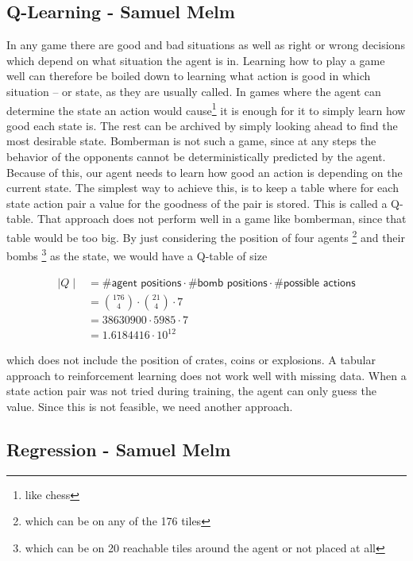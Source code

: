 \documentclass{article}
\begin{document}

\subsection[Q-Learning]{Q-Learning {\small - Samuel Melm}}

In any game there are good and bad situations as well as right or wrong decisions which depend on what situation the agent is in. Learning how to play a game well can therefore be boiled down to learning what action is good in which situation -- or state, as they are usually called. In games where the agent can determine the state an action would cause\footnote{like chess} it is enough for it to simply learn how good each state is. The rest can be archived by simply looking ahead to find the most desirable state. Bomberman is not such a game, since at any steps the behavior of the opponents cannot be deterministically predicted by the agent. Because of this, our agent needs to learn how good an action is depending on the current state. The simplest way to achieve this, is to keep a table where for each state action pair a value for the goodness of the pair is stored. This is called a Q-table. That approach does not perform well in a game like bomberman, since that table would be too big. By just considering the position of four agents \footnote{which can be on any of the 176 tiles} and their bombs \footnote{which can be on 20 reachable tiles around the agent or not placed at all} as the state, we would have a Q-table of size

\begin{align*}
    \mid Q \mid &= \# \textsf{agent positions} \cdot \# \textsf{bomb positions} \cdot \# \textsf{possible actions} \\
    &= {176 \choose 4} \cdot {21 \choose 4 } \cdot 7 \\
    &= 38630900 \cdot 5985 \cdot 7 \\
    &= 1.6184416 \cdot 10^{12}
\end{align*}

which does not include the position of crates, coins or explosions. A tabular approach to reinforcement learning does not work well with missing data. When a state action pair was not tried during training, the agent can only guess the value. Since this is not feasible, we need another approach.


\subsection[Regression]{Regression {\small - Samuel Melm}}
\end{document}
